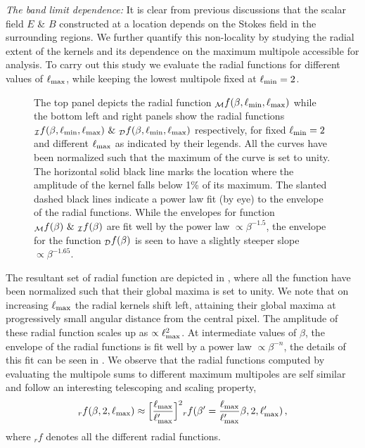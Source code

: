 \noindent \textit{The band limit dependence:} It is clear from previous discussions that the scalar field $E$ \& $B$ constructed at a location depends on the Stokes field in the surrounding regions. We further quantify this non-locality by studying the radial extent of the kernels and its dependence on the maximum multipole accessible for analysis. To carry out this study we evaluate the radial functions for different values of $\ell_{\rm max}$, while keeping the lowest multipole fixed at $\ell_{\rm min}=2$. 
%
\begin{figure}[t]
\centering
{}
\caption{The top panel depicts the radial function  ${_{\mathcal{M}}f}(\beta,\ell_{\rm min},\ell_{\rm max})$ while the bottom left and right panels show the radial functions ${}_{\mathcal{I}}f(\beta,\ell_{\rm min},\ell_{\rm max}) ~\&~ {}_{\mathcal{D}}f(\beta,\ell_{\rm min},\ell_{\rm max})$ respectively, for fixed $\ell_{\rm min}=2$ and different $\ell_{\rm max}$ as indicated by their legends. All the curves have been normalized such that the maximum of the curve is set to unity. The horizontal solid black line marks the location where the amplitude of the kernel falls below 1\% of its maximum. The slanted dashed black lines indicate a power law fit (by eye) to the envelope of the radial functions. While the envelopes for function ${_{\mathcal{M}}f}(\beta)~\&~ {}_{\mathcal{I}}f(\beta)$ are fit well by the power law $\propto \beta^{-1.5}$, the envelope for the function ${}_{\mathcal{D}}f(\beta)$ is seen to have a slightly steeper slope $\propto \beta^{-1.65}$.}
\label{fig:rad_ker_decay}
\end{figure}
%
The resultant set of radial function are depicted in , where all the function have been normalized such that their global maxima is set to unity. We note that on increasing $\ell_{\rm max}$ the radial kernels shift left, attaining their global maxima at progressively small angular distance from the central pixel. The amplitude of these radial function scales up as $\propto \ell_{\rm max}^2$. At intermediate values of $\beta$, the envelope of the radial functions is fit well by a power law $ \propto \beta^{-n}$, the details of this fit can be seen in .
We observe that the radial functions computed by evaluating the multipole sums to different maximum multipoles are self similar and follow an interesting telescoping and scaling property, $${}_rf(\beta,2,\ell_{\rm max}) \approx \Big[\frac{\ell_{\rm max}}{\ell'_{\rm max}}\Big]^2{}_rf(\beta'=\frac{\ell_{\rm max}}{\ell'_{\rm max}} \beta ,2,\ell'_{\rm max}) \,,$$ where ${}_rf$ denotes all the different radial functions. 
